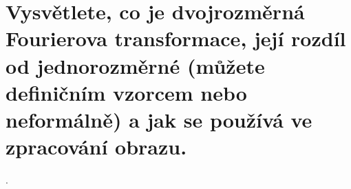 \section{Vysvětlete, co je dvojrozměrná Fourierova transformace, její rozdíl od jednorozměrné (můžete definičním vzorcem 
nebo neformálně) a jak se používá ve zpracování obrazu.}.